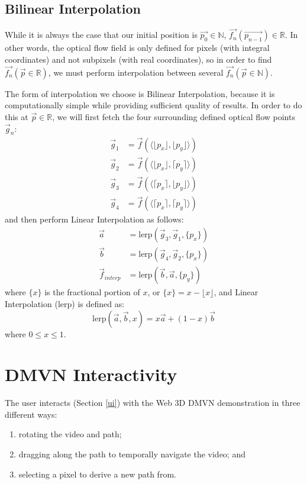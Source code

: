 \subsection{Bilinear Interpolation}
\label{lerp}

While it is always the case that our initial position is $\vec{p_0} \in \mathbb{N}$, $\vec{f_n}(\vec{p_{n-1}}) \in \mathbb{R}$. In other words, the optical flow field is only defined for pixels (with integral coordinates) and not subpixels (with real coordinates), so in order to find $\vec{f_n}(\vec{p} \in \mathbb{R})$, we must perform interpolation between several $\vec{f_n}(\vec{p} \in \mathbb{N})$.
\par The form of interpolation we choose is Bilinear Interpolation, because it is computationally simple while providing sufficient quality of results. In order to do this at $\vec{p} \in \mathbb{R}$, we will first fetch the four surrounding defined optical flow points $\vec{g}_n$:\cite{linearinterp}
\begin{align*}
    \vec{g}_1 & = \vec{f}(\langle \lfloor p_x \rfloor, \lfloor p_y \rfloor \rangle) \\
    \vec{g}_2 & = \vec{f}(\langle \lfloor p_x \rfloor, \lceil p_y \rceil \rangle) \\
    \vec{g}_3 & = \vec{f}(\langle \lceil p_x \rceil, \lfloor p_y \rfloor \rangle) \\
    \vec{g}_4 & = \vec{f}(\langle \lceil p_x \rceil, \lceil p_y \rceil \rangle)
\end{align*}
and then perform Linear Interpolation as follows:
\begin{align*}
    \vec{a} & = \text{lerp} (\vec{g}_3, \vec{g}_1, \{p_x\}) \\
    \vec{b} & = \text{lerp} (\vec{g}_4, \vec{g}_2, \{p_x\}) \\
    \vec{f}_{interp} & = \text{lerp} (\vec{b}, \vec{a}, \{p_y\})
\end{align*}
where $\{x\}$ is the fractional portion of $x$, or $\{x\} = x - \lfloor x \rfloor$, and Linear Interpolation (lerp) is defined as:
\begin{equation}
    \text{lerp}(\vec{a}, \vec{b}, x) = x\vec{a} + (1-x)\vec{b}
\end{equation}
where $0 \leq x \leq 1$.


\section{DMVN Interactivity}
The user interacts (Section \ref{ui}) with the Web 3D DMVN demonstration in three different ways:
\begin{enumerate}
\item rotating the video and path;
\item dragging along the path to temporally navigate the video; and
\item selecting a pixel to derive a new path from.
\end{enumerate}

